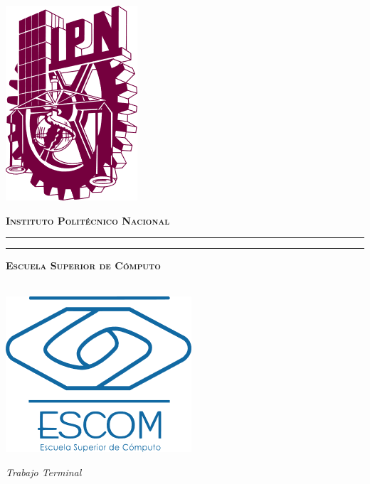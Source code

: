 \begin{titlepage} %

\thispagestyle{empty}

\begin{minipage}[c][0.1\textheight][c]{0.2\textwidth}
	\begin{center}
    	\includegraphics[scale=0.4]{images/logos/IPN}
	\end{center}
\end{minipage}
\begin{minipage}[c][0.1\textheight][t]{0.70\textwidth}
	\begin{center}
    	{\scshape {\Huge \textbf{Instituto Politécnico Nacional}}}
	    \vspace{.3cm}
    	\hrule height2.5pt
	    \vspace{.1cm}
    	\hrule height1pt
	    \vspace{.3cm}
    	{\scshape {\Huge \textbf{Escuela Superior de Cómputo}}}
	\end{center}
\end{minipage}

\begin{minipage}[c][0.55\textheight][t]{0.2\textwidth}
	\begin{center}
		\hskip2pt
		\vrule width2.5pt height18cm
        \hskip1mm
        \vrule width1pt height18cm \\[0.25cm]
        \includegraphics[scale=0.45]{images/logos/ESCOM}
      \end{center}
\end{minipage}
\begin{minipage}[c][0.6\textheight][t]{0.65\textwidth}
  \begin{center}
   \vspace{1cm}
    {
	\LARGE \textit{Trabajo Terminal}
    }
    \vspace{1cm}
	

\end{center}
\end{minipage}
\end{titlepage}
